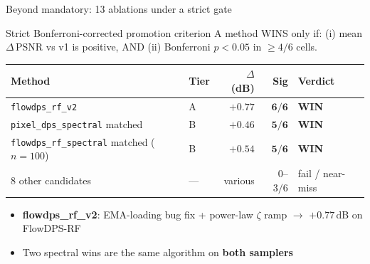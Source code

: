 \documentclass[10pt,aspectratio=169]{beamer}
\begin{document}
\begin{frame}{Beyond mandatory: 13 ablations under a strict gate}
  \begin{block}{Strict Bonferroni-corrected promotion criterion}
    A method WINS only if:
    (i) mean $\Delta$\,PSNR vs v1 is positive, AND
    (ii) Bonferroni $p<0.05$ in $\geq 4 / 6$ cells.
  \end{block}

  \begin{table}
    \centering
    \small
    \begin{tabular}{llrrl}
      \toprule
      Method & Tier & $\Delta$ (dB) & Sig & Verdict \\
      \midrule
      \texttt{flowdps\_rf\_v2}             & A  & $\boldsymbol{+0.77}$ & $\boldsymbol{6/6}$ & \textcolor{good}{\textbf{WIN}} \\
      \texttt{pixel\_dps\_spectral} matched & B  & $\boldsymbol{+0.46}$ & $\boldsymbol{5/6}$ & \textcolor{good}{\textbf{WIN}} \\
      \texttt{flowdps\_rf\_spectral} matched ($n{=}100$) & B & $\boldsymbol{+0.54}$ & $\boldsymbol{5/6}$ & \textcolor{good}{\textbf{WIN}} \\
      \midrule
      8 other candidates                   & --- & various & 0--$3/6$ & \textcolor{bad}{fail / near-miss} \\
      \bottomrule
    \end{tabular}
  \end{table}

  \begin{itemize}
    \item \textbf{flowdps\_rf\_v2}: EMA-loading bug fix + power-law
          $\zeta$ ramp $\to$ $+0.77$\,dB on FlowDPS-RF
    \item Two spectral wins are the same algorithm on \textbf{both samplers}
  \end{itemize}

\end{frame}
\end{document}
